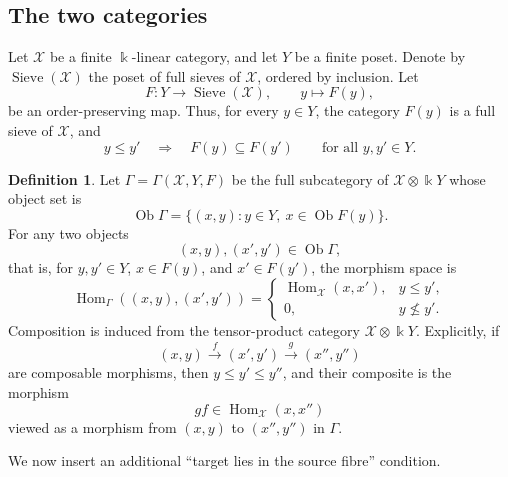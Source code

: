 \documentclass[12pt,a4paper,english,reqno]{amsart}
\theoremstyle{plain}
\theoremstyle{definition}
\newtheorem{definition}[theorem]{Definition}
\newcommand{\kk}{\Bbbk}
\newcommand{\Hom}{\operatorname{Hom}}
\newcommand{\X}{\mathcal X}
\newcommand{\G}{\Gamma}
\begin{document}
\subsection{The two categories}

Let $\X$ be a finite $\kk$-linear category, and let $Y$ be a
finite poset. Denote by $\operatorname{Sieve}(\X)$ the poset of full
sieves of $\X$, ordered by inclusion. Let
\[
F\colon Y\longrightarrow \operatorname{Sieve}(\X),
\qquad
y\longmapsto F(y),
\]
be an order-preserving map. Thus, for every $y\in Y$, the category
$F(y)$ is a full sieve of $\X$, and
\begin{equation}
y\leq y'
\quad\Longrightarrow\quad
F(y)\subseteq F(y')
\qquad
\text{for all }y,y'\in Y.
\label{eq:F-monotone}
\end{equation}

\begin{definition}
\label{def:Gamma}
Let $\G=\G(\X,Y,F)$ be the full subcategory of
$\X\otimes\kk Y$ whose object set is
\[
\operatorname{Ob}\G
=
\{(x,y):y\in Y,\ x\in\operatorname{Ob}F(y)\}.
\]
For any two objects
\[
(x,y),(x',y')\in\operatorname{Ob}\G,
\]
that is, for $y,y'\in Y$, $x\in F(y)$, and $x'\in F(y')$, the
morphism space is
\[
\Hom_{\G}((x,y),(x',y'))
=
\begin{cases}
\Hom_{\X}(x,x'), & y\leq y',\\
0,                & y\nleq y'.
\end{cases}
\]
Composition is induced from the tensor-product category
$\X\otimes\kk Y$. Explicitly, if
\[
(x,y)\xrightarrow{f}(x',y')
\xrightarrow{g}(x'',y'')
\]
are composable morphisms, then $y\leq y'\leq y''$, and their composite
is the morphism
\[
gf\in\Hom_{\X}(x,x'')
\]
viewed as a morphism from $(x,y)$ to $(x'',y'')$ in $\G$.
\end{definition}
We now insert an additional ``target lies in the source fibre'' condition.
\end{document}
